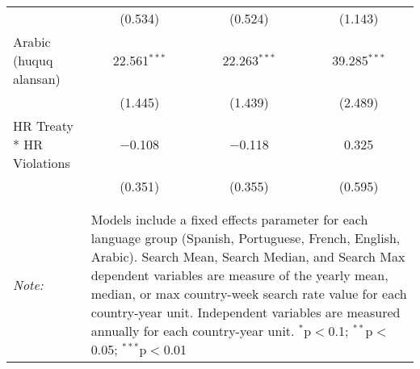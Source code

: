 \begin{table}[!htbp]
\begin{tabular}{@{\extracolsep{5pt}}lccc}
  & (0.534) & (0.524) & (1.143) \\ 
  Arabic (huquq alansan) & 22.561$^{***}$ & 22.263$^{***}$ & 39.285$^{***}$ \\ 
  & (1.445) & (1.439) & (2.489) \\ 
  HR Treaty * HR Violations & $-$0.108 & $-$0.118 & 0.325 \\ 
  & (0.351) & (0.355) & (0.595) \\ 
 \hline \\[-1.8ex] 
\hline 
\hline \\[-1.8ex] 
\textit{Note:}  & \multicolumn{3}{l}{\parbox[t]{8cm}{Models include a fixed effects parameter for each language group (Spanish, Portuguese, French, English, Arabic). Search Mean, Search Median, and Search Max dependent variables are measure of the yearly mean, median, or max country-week search rate value for each country-year unit. Independent variables are measured annually for each country-year unit. $^{*}$p$<$0.1; $^{**}$p$<$0.05; $^{***}$p$<$0.01}} \\ 
\end{tabular} 
\end{table} 
